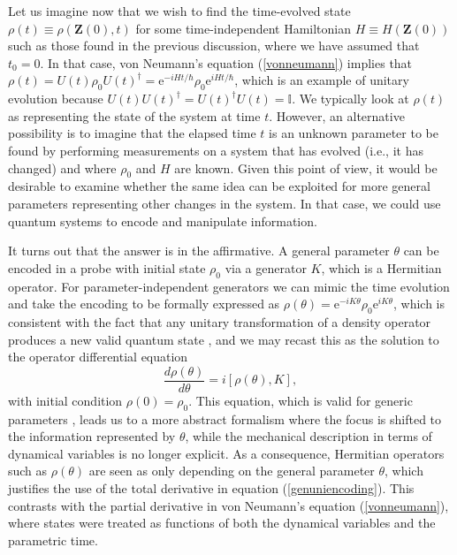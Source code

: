 Let us imagine now that we wish to find the time-evolved state $\rho(t) \equiv \rho(\boldsymbol{Z}(0),t)$ for some time-independent Hamiltonian $H \equiv H(\boldsymbol{Z}(0))$ such as those found in the previous discussion, where we have assumed that $t_0 = 0$. In that case, von Neumann's equation (\ref{vonneumann}) implies that $\rho(t) = U(t) \rho_0 U(t)^\dagger = \mathrm{e}^{-i H t/\hbar} \rho_0 \mathrm{e}^{i H t/\hbar}$, which is an example of unitary evolution because $U(t)U(t)^\dagger = U(t)^\dagger U(t) = \mathbb{I}$. We typically look at $\rho(t)$ as representing the state of the system at time $t$. However, an alternative possibility is to imagine that the elapsed time $t$ is an unknown parameter to be found by performing measurements on a system that has evolved (i.e., it has changed) and where $\rho_0$ and $H$ are known. Given this point of view, it would be desirable to examine whether the same idea can be exploited for more general parameters representing other changes in the system. In that case, we could use quantum systems to encode and manipulate information. 

It turns out that the answer is in the affirmative. A general parameter $\theta$ can be encoded in a probe with initial state $\rho_0$ via a generator $K$, which is a Hermitian operator. For parameter-independent generators we can mimic the time evolution and take the encoding to be formally expressed as $\rho(\theta) = \mathrm{e}^{-i K \theta} \rho_0 \mathrm{e}^{i K \theta}$, which is consistent with the fact that any unitary transformation of a density operator produces a new valid quantum state \cite{dunningham2018}, and we may recast this as the solution to the operator differential equation
\begin{equation}
\frac{d\rho(\theta)}{d\theta} = i[\rho(\theta),K],
\label{genuniencoding}
\end{equation}
with initial condition $\rho(0)=\rho_0$. This equation, which is valid for generic parameters \cite{kok2010}, leads us to a more abstract formalism where the focus is shifted to the information represented by $\theta$, while the mechanical description in terms of dynamical variables is no longer explicit. As a consequence, Hermitian operators such as $\rho(\theta)$ are seen as only depending on the general parameter $\theta$, which justifies the use of the total derivative in equation (\ref{genuniencoding}). This contrasts with the partial derivative in von Neumann's equation (\ref{vonneumann}), where states were treated as functions of both the dynamical variables and the parametric time.  

